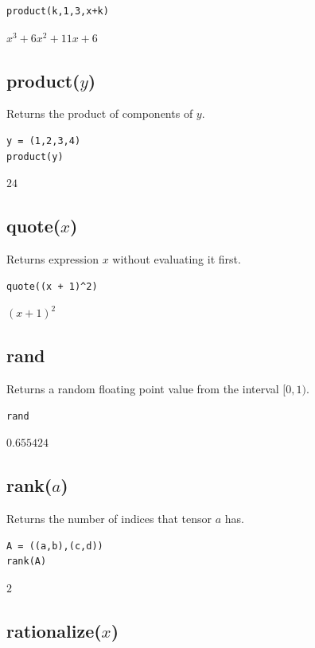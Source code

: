 {\color{blue}
\begin{verbatim}
product(k,1,3,x+k)
\end{verbatim}
}

$\displaystyle x^3+6x^2+11x+6$

\subsection*{product($y$)}

Returns the product of components of $y$.

{\color{blue}
\begin{verbatim}
y = (1,2,3,4)
product(y)
\end{verbatim}
}

$24$

\subsection*{quote($x$)}

Returns expression $x$ without evaluating it first.

{\color{blue}
\begin{verbatim}
quote((x + 1)^2)
\end{verbatim}
}

$\displaystyle (x+1)^2$

\subsection*{rand}

Returns a random floating point value from the interval $[0,1)$.

{\color{blue}
\begin{verbatim}
rand
\end{verbatim}
}

$0.655424$

\subsection*{rank($a$)}

Returns the number of indices that tensor $a$ has.

{\color{blue}
\begin{verbatim}
A = ((a,b),(c,d))
rank(A)
\end{verbatim}
}

$2$

\subsection*{rationalize($x$)}


